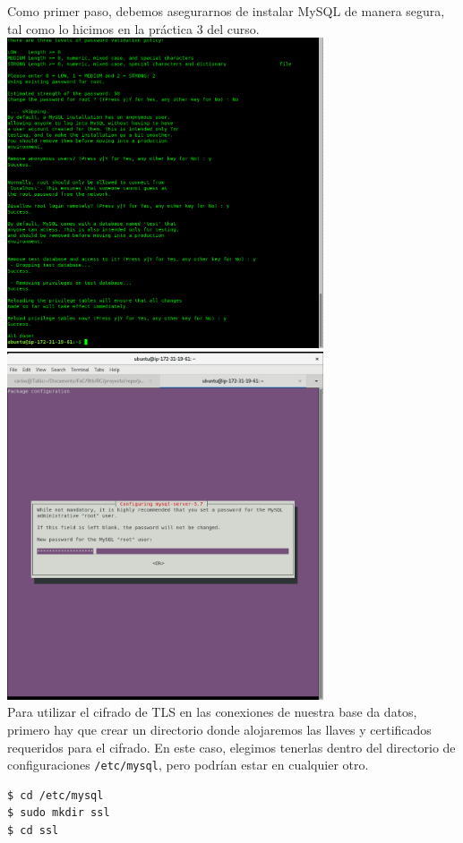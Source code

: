 \documentclass[9pt]{article}
\begin{document}
Como primer paso, debemos asegurarnos de instalar \textsf{MySQL} de manera segura, tal como lo hicimos en la práctica 3 del curso. \\
\includegraphics[width=0.7\textwidth]{mysql_secure_installation} \\
\includegraphics[width=0.7\textwidth]{mysql_install}\\


Para utilizar el cifrado de \textsf{TLS} en las conexiones de nuestra base da datos, primero hay que crear un directorio donde alojaremos las llaves y certificados requeridos para el cifrado. En este caso, elegimos tenerlas dentro del directorio de configuraciones \texttt{/etc/mysql}, pero podrían estar en cualquier otro.

\begin{verbatim}
$ cd /etc/mysql
$ sudo mkdir ssl
$ cd ssl
\end{verbatim}
\end{document}
